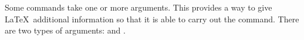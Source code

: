 Some \glspl{command} take one or more \glspl*{argument}. This
provides a way to give \LaTeX\ additional information so that it is
able to carry out the command. There are two types of arguments:
 and .

